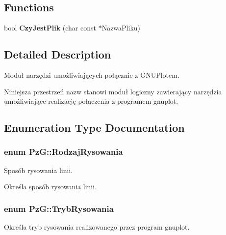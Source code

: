 \subsection*{Functions}
\begin{DoxyCompactItemize}
\item 
\hypertarget{namespace_pz_g_ae1ae4d36f66c77879380ba73da8e20e3}{bool {\bfseries Czy\+Jest\+Plik} (char const $\ast$Nazwa\+Pliku)}\label{namespace_pz_g_ae1ae4d36f66c77879380ba73da8e20e3}

\end{DoxyCompactItemize}


\subsection{Detailed Description}
Moduł narzędzi umożliwiających połącznie z G\+N\+U\+Plotem. 

Niniejsza przestrzeń nazw stanowi moduł logiczny zawierający narzędzia umożliwiające realizację połączenia z programem {\ttfamily gnuplot}. 

\subsection{Enumeration Type Documentation}
\hypertarget{namespace_pz_g_a705c92106f39b7d0c34a6739d10ff0b6}{
\subsubsection[{Rodzaj\+Rysowania}]{\setlength{\rightskip}{0pt plus 5cm}enum {\bf Pz\+G\+::\+Rodzaj\+Rysowania}}}\label{namespace_pz_g_a705c92106f39b7d0c34a6739d10ff0b6}


Sposób rysowania linii. 

Określa sposób rysowania linii. \hypertarget{namespace_pz_g_aeedae1ef10c66d720f9e89de408ca4ca}{
\subsubsection[{Tryb\+Rysowania}]{\setlength{\rightskip}{0pt plus 5cm}enum {\bf Pz\+G\+::\+Tryb\+Rysowania}}}\label{namespace_pz_g_aeedae1ef10c66d720f9e89de408ca4ca}


Określa tryb rysowania realizowanego przez program {\ttfamily gnuplot}. 

